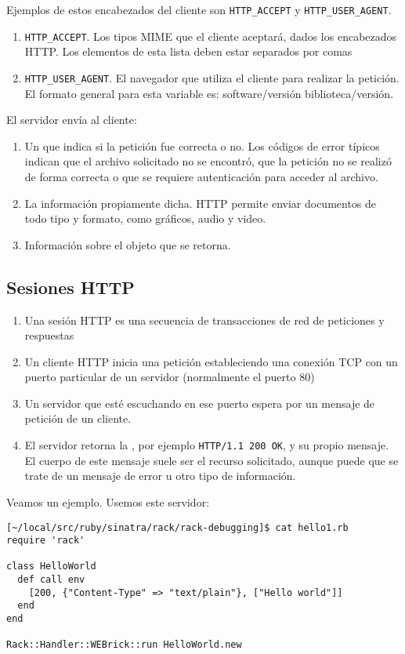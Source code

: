 \begin{enumerate}
Ejemplos de estos encabezados del cliente son
\verb|HTTP_ACCEPT| y 
\verb|HTTP_USER_AGENT|.
  \begin{enumerate}
  \item 
  \verb|HTTP_ACCEPT|. Los tipos MIME que el cliente aceptará, dados
  los encabezados HTTP. 
  Los elementos de esta lista deben
  estar separados por comas
  \item 
  \verb|HTTP_USER_AGENT|. El navegador que utiliza el cliente para
  realizar la petición. El formato general para esta variable es:
  software/versión biblioteca/versión.
  \end{enumerate}
El servidor envía al cliente:
  \begin{enumerate}
  \item 
  Un  que indica si la petición fue correcta o no.
  Los códigos de error típicos indican que el archivo solicitado no
  se encontró, que la petición no se realizó de forma correcta o que
  se requiere autenticación para acceder al archivo.
  \item 
  La información propiamente dicha. HTTP permite enviar documentos
  de todo tipo y formato, como
  gráficos, audio y video.
  \item 
  Información sobre el objeto que se retorna.
  \end{enumerate}
\end{enumerate}

\subsection{Sesiones HTTP}
\begin{enumerate}
\item 
Una sesión HTTP es una secuencia de transacciones de red de peticiones y respuestas

\item 
Un cliente HTTP inicia una petición estableciendo una conexión TCP con un puerto 
particular de un servidor (normalmente el puerto 80)
\item 
Un servidor que esté escuchando en ese puerto espera por un mensaje
de petición de un cliente.
\item 
El servidor retorna la , por ejemplo \verb"HTTP/1.1 200 OK",
y su propio mensaje. El cuerpo de este mensaje suele ser el recurso
solicitado, aunque puede que se trate de un mensaje de error u otro tipo de información.
\end{enumerate}

Veamos un ejemplo. Usemos este servidor:
\begin{verbatim}
[~/local/src/ruby/sinatra/rack/rack-debugging]$ cat hello1.rb 
require 'rack'

class HelloWorld
  def call env
    [200, {"Content-Type" => "text/plain"}, ["Hello world"]]
  end
end

Rack::Handler::WEBrick::run HelloWorld.new
\end{verbatim}


